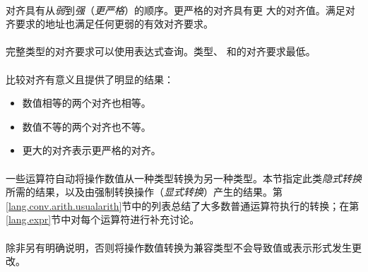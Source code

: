 {\paragraph{}
对齐具有从\textit{弱}到\textit{强}（\textit{更严格}）的顺序。更严格的对齐具有更
大的对齐值。满足对齐要求的地址也满足任何更弱的有效对齐要求。

\paragraph{}
完整类型的对齐要求可以使用表达式查询。类型、
和的对齐要求最低。

\paragraph{}
比较对齐有意义且提供了明显的结果：
\begin{itemize}
  \item{数值相等的两个对齐也相等。}
  \item{数值不等的两个对齐也不等。}
  \item{更大的对齐表示更严格的对齐。}
\end{itemize}

\paragraph{}
一些运算符自动将操作数值从一种类型转换为另一种类型。本节指定此类\textit{隐式转换
}所需的结果，以及由强制转换操作（\textit{显式转换}）产生的结果。第
\ref{lang.conv.arith.usualarith}节中的列表总结了大多数普通运算符执行的转换；在第
\ref{lang.expr}节中对每个运算符进行补充讨论。

\paragraph{}
除非另有明确说明，否则将操作数值转换为兼容类型不会导致值或表示形式发生更改。


}
